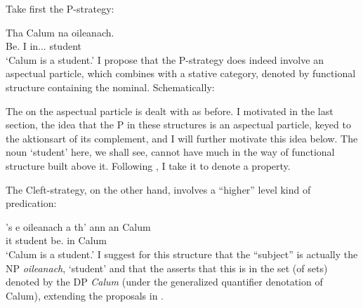 \documentclass[output=paper]{langsci/langscibook}
\begin{document}
Take first the P-strategy:

\ea {}
\sn
\gll Tha  Calum  na  oileanach.\\
Be.\Prs{}  I  in.\Poss.\Tsg.\M{}  student \\
\glt \enquote*{Calum is a student.}
\z
I propose that the P-strategy does indeed involve an aspectual particle, which
combines with a  stative category, denoted by functional structure containing
the nominal. Schematically:

\ea
{}

\z
The   on the aspectual particle is dealt with as before. I motivated
in the last section, the idea that the P in these structures is an aspectual
particle, keyed to the aktionsart of its complement, and I will further
motivate this idea below. The noun `student' here, we shall see, cannot have
much in the way of functional structure built above it. Following
\citet{adger-ramchand:03}, I take it to denote a property.

The Cleft-strategy, on the other hand, involves a ``higher'' level kind of
predication:

\ea {}
\sn \gll 's e oileanach a th' {ann an} Calum\\
\Cop{} it student \Rel{} be.\Prs{} in Calum\\
\glt \enquote*{Calum is a student.}
\z
I suggest for this structure that the ``subject'' is actually the NP
\emph{oileanach}, `student' and that the  asserts that this is in
the set (of sets) denoted by the DP \emph{Calum} (under the generalized
quantifier denotation of Calum), extending the proposals in
\citet{Adger2011b}.\newpage
\end{document}
